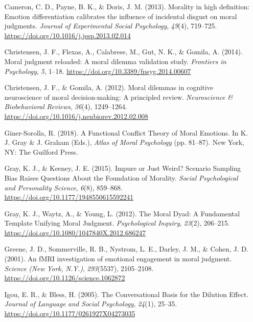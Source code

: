 \documentclass[
  man,floatsintext]{apa6}
\newlength{\cslhangindent}
\newenvironment{CSLReferences}[2] %
 {\begin{list}{}{%
  \setlength{\itemindent}{0pt}
  \setlength{\leftmargin}{0pt}
  \setlength{\parsep}{0pt}
  \ifodd #1
   \setlength{\leftmargin}{\cslhangindent}
   \setlength{\itemindent}{-1\cslhangindent}
  \fi
  \setlength{\itemsep}{#2\baselineskip}}}
 {\end{list}}
\begin{document}
\label{refs}
\begin{CSLReferences}{1}{0}
Cameron, C. D., Payne, B. K., \& Doris, J. M. (2013). Morality in high definition: {Emotion} differentiation calibrates the influence of incidental disgust on moral judgments. \emph{Journal of Experimental Social Psychology}, \emph{49}(4), 719--725. \url{https://doi.org/10.1016/j.jesp.2013.02.014}

Christensen, J. F., Flexas, A., Calabrese, M., Gut, N. K., \& Gomila, A. (2014). Moral judgment reloaded: A moral dilemma validation study. \emph{Frontiers in Psychology}, \emph{5}, 1--18. \url{https://doi.org/10.3389/fpsyg.2014.00607}

Christensen, J. F., \& Gomila, A. (2012). Moral dilemmas in cognitive neuroscience of moral decision-making: {A} principled review. \emph{Neuroscience \& Biobehavioral Reviews}, \emph{36}(4), 1249--1264. \url{https://doi.org/10.1016/j.neubiorev.2012.02.008}

Giner-Sorolla, R. (2018). A {Functional Conflict Theory} of {Moral Emotions}. In K. J. Gray \& J. Graham (Eds.), \emph{Atlas of {Moral Psychology}} (pp. 81--87). {New York, NY}: {The Guilford Press}.

Gray, K. J., \& Keeney, J. E. (2015). Impure or {Just Weird}? {Scenario Sampling Bias Raises Questions About} the {Foundation} of {Morality}. \emph{Social Psychological and Personality Science}, \emph{6}(8), 859--868. \url{https://doi.org/10.1177/1948550615592241}

Gray, K. J., Waytz, A., \& Young, L. (2012). The {Moral Dyad}: {A Fundamental Template Unifying Moral Judgment}. \emph{Psychological Inquiry}, \emph{23}(2), 206--215. \url{https://doi.org/10.1080/1047840X.2012.686247}

Greene, J. D., Sommerville, R. B., Nystrom, L. E., Darley, J. M., \& Cohen, J. D. (2001). An {fMRI} investigation of emotional engagement in moral judgment. \emph{Science (New York, N.Y.)}, \emph{293}(5537), 2105--2108. \url{https://doi.org/10.1126/science.1062872}

Igou, E. R., \& Bless, H. (2005). The {Conversational Basis} for the {Dilution Effect}. \emph{Journal of Language and Social Psychology}, \emph{24}(1), 25--35. \url{https://doi.org/10.1177/0261927X04273035}


\end{CSLReferences}
\end{document}
